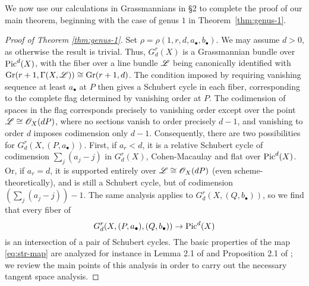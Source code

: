 \documentclass{amsart}
\begin{document}
We now use our calculations in Grassmannians in \S2 to complete the proof of our 
main theorem, beginning with the case of genus $1$ in 
Theorem~\ref{thm:genus-1}.

\begin{proof}[Proof of Theorem \ref{thm:genus-1}] 
Set $\rho=\rho(1,r,d,a_{\bullet},b_{\bullet})$.
We may assume $d>0$, as otherwise the result is trivial. Thus,
$G^r_d(X)$ is a Grassmannian bundle over $\operatorname{Pic}^d(X)$, with the fiber
over a line bundle ${\mathscr L}$ being canonically identified with 
$\operatorname{Gr}(r+1,\Gamma(X,{\mathscr L}))\cong \operatorname{Gr}(r+1,d)$. The condition imposed by
requiring vanishing sequence at least $a_{\bullet}$ at $P$ then gives
a Schubert cycle in each fiber, corresponding to the complete flag determined by
vanishing order at $P$. The codimension of spaces in the flag corresponds
precisely to vanishing order except over the point ${\mathscr L} \cong {\mathscr O}_X(dP)$,
where no sections vanish to order precisely $d-1$, and vanishing to order
$d$ imposes codimension only $d-1$. Consequently, there are
two possibilities for $G^r_d(X,(P,a_{\bullet}))$. First, if $a_r<d$, it is
a relative Schubert cycle of codimension $\sum_j (a_j-j)$ in
$G^r_d(X)$, Cohen-Macaulay and flat over $\operatorname{Pic}^d(X)$.
Or,
if $a_r=d$, it is supported entirely over ${\mathscr L} \cong {\mathscr O}_X(dP)$ (even
scheme-theoretically), and is still a Schubert cycle, but of codimension
$(\sum_j (a_j-j))-1$. The same analysis applies to 
$G^r_d(X,(Q,b_{\bullet}))$, so we find that every fiber of 
\begin{equation}\label{eq:str-map} 
G^r_d(X,(P,a_{\bullet}),(Q,b_{\bullet})) \to \operatorname{Pic}^d(X)
\end{equation} 
is an intersection of a pair of Schubert cycles. The basic properties of
the map \eqref{eq:str-map} are analyzed for instance in Lemma 2.1 of
\cite{os18} and Proposition 2.1 of \cite{os26}; we review the main points
of this analysis in order to carry out the necessary tangent space analysis.


\end{proof}
\end{document}
